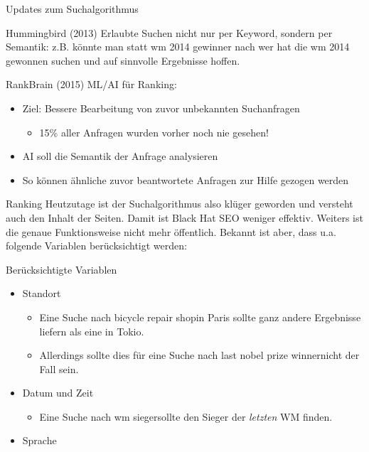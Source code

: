 \documentclass[11pt]{beamer}
\begin{document}
\begin{frame}{Updates zum Suchalgorithmus}
    \begin{block}{Hummingbird (2013)}
        Erlaubte Suchen nicht nur per Keyword, sondern per Semantik: z.B. könnte man statt \dq wm 2014 gewinner \dq nach \dq wer hat die wm 2014 gewonnen \dq suchen und auf sinnvolle Ergebnisse hoffen.
    \end{block}
    
    
    \begin{block}{RankBrain (2015)}
        ML/AI für Ranking:
        \begin{itemize}
            \item Ziel: Bessere Bearbeitung von zuvor unbekannten Suchanfragen
            \begin{itemize}
                \item 15\% aller Anfragen wurden vorher noch nie gesehen!
            \end{itemize}
            \item AI soll die Semantik der Anfrage analysieren
            \item So können ähnliche zuvor beantwortete Anfragen zur Hilfe gezogen werden
        \end{itemize}
    \end{block}
\end{frame}

\begin{frame}{Ranking}
    Heutzutage ist der Suchalgorithmus also klüger geworden und versteht auch den Inhalt der Seiten. Damit ist Black Hat SEO weniger effektiv. Weiters ist die genaue Funktionsweise nicht mehr öffentlich. Bekannt ist aber, dass u.a. folgende Variablen berücksichtigt werden:
    
    
    \begin{block}{Berücksichtigte Variablen}
        \begin{itemize}
            \item Standort
            \begin{itemize}
                \item Eine Suche nach \dq bicycle repair shop\dq in Paris sollte ganz andere Ergebnisse liefern als eine in Tokio. 
                \item Allerdings sollte dies für eine Suche nach \dq last nobel prize winner\dq nicht der Fall sein.
            \end{itemize}
            \item Datum und Zeit
            \begin{itemize}
                \item Eine Suche nach \dq wm sieger\dq  sollte den Sieger der \textit{letzten} WM finden.
            \end{itemize}
            \item Sprache
        \end{itemize}
    \end{block}
\end{frame}
\end{document}
